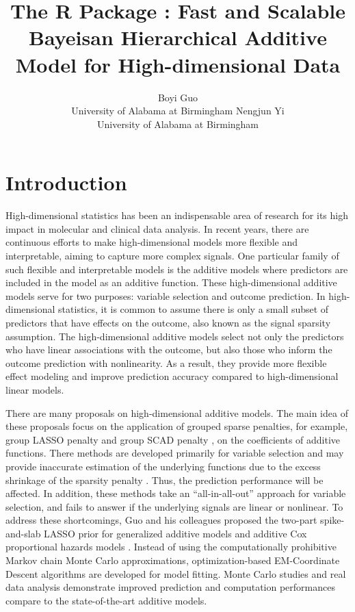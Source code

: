 \documentclass[
]{jss}
\author{
Boyi Guo\\University of Alabama at Birmingham \And Nengjun
Yi\\University of Alabama at Birmingham
}
\title{The R Package \pkg{BHAM}: Fast and Scalable Bayeisan Hierarchical
Additive Model for High-dimensional Data}
\begin{document}
\newcommand{\pr}{\text{Pr}}
\newcommand{\bs}[1]{\boldsymbol{#1}}
\newcommand{\tp}{*}
\newcommand{\simiid}{\overset{\text{iid}}{\sim}}

\section{Introduction}

High-dimensional statistics has been an indispensable area of research
for its high impact in molecular and clinical data analysis. In recent
years, there are continuous efforts to make high-dimensional models more
flexible and interpretable, aiming to capture more complex signals. One
particular family of such flexible and interpretable models is the
additive models where predictors are included in the model as an
additive function. These high-dimensional additive models serve for two
purposes: variable selection and outcome prediction. In high-dimensional
statistics, it is common to assume there is only a small subset of
predictors that have effects on the outcome, also known as the signal
sparsity assumption. \citep{buhlmann2011} The high-dimensional additive
models select not only the predictors who have linear associations with
the outcome, but also those who inform the outcome prediction with
nonlinearity. As a result, they provide more flexible effect modeling
and improve prediction accuracy compared to high-dimensional linear
models.

There are many proposals on high-dimensional additive models. The main
idea of these proposals focus on the application of grouped sparse
penalties, for example, group LASSO penalty
\citep{ravikumar2009, huang2010} and group SCAD penalty
\citep{wang2007, xue2009}, on the coefficients of additive functions.
There methods are developed primarily for variable selection and may
provide inaccurate estimation of the underlying functions due to the
excess shrinkage of the sparsity penalty \citep{scheipl2013}. Thus, the
prediction performance will be affected. In addition, these methods take
an ``all-in-all-out'' approach for variable selection, and fails to
answer if the underlying signals are linear or nonlinear. To address
these shortcomings, Guo and his colleagues proposed the two-part
spike-and-slab LASSO prior for generalized additive models
\citep{guo2022_GAM} and additive Cox proportional hazards models
\citep{guo2022_Cox}. Instead of using the computationally prohibitive
Markov chain Monte Carlo approximations, optimization-based
EM-Coordinate Descent algorithms are developed for model fitting. Monte
Carlo studies and real data analysis demonstrate improved prediction and
computation performances compare to the state-of-the-art additive
models.
\end{document}
